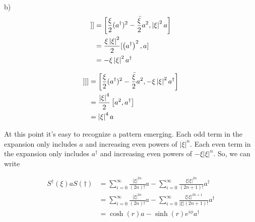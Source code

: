\begin{homeworkProblem}
\begin{homeworkSection}{b)}
\begin{align}
   [A,[A,[A,a]]] &= \left[ \Aop, \left| \xi \right|^{2} a \right] \\
                &= \frac{\xi \left| \xi \right|^{2}}{2}
   [\left( a^{\dagger} \right)^{2}, a] \\
   &= -\xi \left| \xi \right|^{2} a^{\dagger}
\end{align}

\begin{align}
   [A,[A,[A,[A,a]]]] &= \left[ \Aop, -\xi \left| \xi \right|^{2} a^{\dagger}
   \right] \\
   &= \frac{\left| \xi \right|^{4}}{2}\left[a^{2}, a^{\dagger}\right] \\
   &= \left| \xi \right|^{4} a
\end{align}

At this point it's easy to recognize a pattern emerging. Each odd term in the
expansion only includes $ a $ and increasing even powers of $ \left| \xi \right|^{n}
$. Each even term in the expansion only includes $ a^{\dagger} $ and increasing
even powers of $ -\xi \left| \xi \right|^{n} $. So, we can write

\begin{align}
   S^{\dagger}(\xi)aS(\dagger) &=
   \sum^{\infty}_{i=0} \frac{\left| \xi \right|^{2n}}{(2n)!} a -
   \sum^{\infty}_{i=0} \frac{\xi \left| \xi \right|^{2n}}{(2n+1)!} a^{\dagger}
   \\
   &=
   \sum^{\infty}_{i=0} \frac{\left| \xi \right|^{2n}}{(2n)!} a -
   \sum^{\infty}_{i=0} \frac{\xi \left| \xi \right|^{2n+1}}{\left| \xi
   \right|(2n+1)!} a^{\dagger} \\
   &= \cosh(r)a - \sinh(r)e^{i \phi}a^{\dagger}
\end{align}

\end{homeworkSection}
\end{homeworkProblem}
